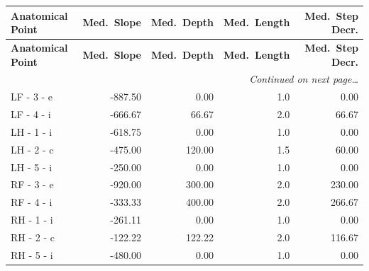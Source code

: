 \documentclass[a4paper,11pt]{article}
\begin{document}
\begin{small}
\begin{longtable}{p{4.5cm}rrrr}
\toprule
\textbf{Anatomical Point} &
\textbf{Med.\ Slope} &
\textbf{Med.\ Depth} &
\textbf{Med.\ Length} &
\textbf{Med.\ Step Decr.} \\
\midrule
\endfirsthead
\toprule
\textbf{Anatomical Point} &
\textbf{Med.\ Slope} &
\textbf{Med.\ Depth} &
\textbf{Med.\ Length} &
\textbf{Med.\ Step Decr.} \\
\midrule
\endhead
\midrule
\multicolumn{5}{r}{\small\emph{Continued on next page\ldots}} \\
\endfoot
\bottomrule
\endlastfoot
LF - 3 - e & -887.50 & 0.00 & 1.0 & 0.00 \\
LF - 4 - i & -666.67 & 66.67 & 2.0 & 66.67 \\
LH - 1 - i & -618.75 & 0.00 & 1.0 & 0.00 \\
LH - 2 - c & -475.00 & 120.00 & 1.5 & 60.00 \\
LH - 5 - i & -250.00 & 0.00 & 1.0 & 0.00 \\
RF - 3 - e & -920.00 & 300.00 & 2.0 & 230.00 \\
RF - 4 - i & -333.33 & 400.00 & 2.0 & 266.67 \\
RH - 1 - i & -261.11 & 0.00 & 1.0 & 0.00 \\
RH - 2 - c & -122.22 & 122.22 & 2.0 & 116.67 \\
RH - 5 - i & -480.00 & 0.00 & 1.0 & 0.00 \\
\end{longtable}
\end{small}
\end{document}
